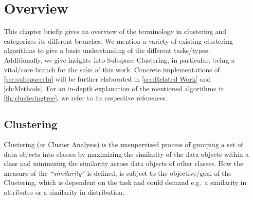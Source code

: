 \chapter{Overview}\label{ch:overview}

This chapter briefly gives an overview of the terminology in clustering and categorizes its different branches. We mention a variety of existing clustering algorithms to give a basic understanding of the different tasks/types. Additionally, we give insights into Subspace Clustering, in particular, being a vital/core branch for the sake of this work. Concrete implementations of \autoref{sec:subspaceclu} will be further elaborated in \autoref{sec:Related Work} and \autoref{ch:Methods}. For an in-depth explanation of the mentioned algorithms in \autoref{fig:clusteringtree}, we refer to its respective references.

\section{Clustering}\label{sec:clu}
Clustering (or Cluster Analysis) is the unsupervised process of grouping a set of data objects into classes by maximizing the similarity of the data objects within a class and minimizing the similarity across data objects of other classes. How the measure of the \textit{``similarity''} is defined, is subject to the objective/goal of the Clustering, which is dependent on the task and could demand e.g.\ a similarity in attributes or a similarity in distribution. 


